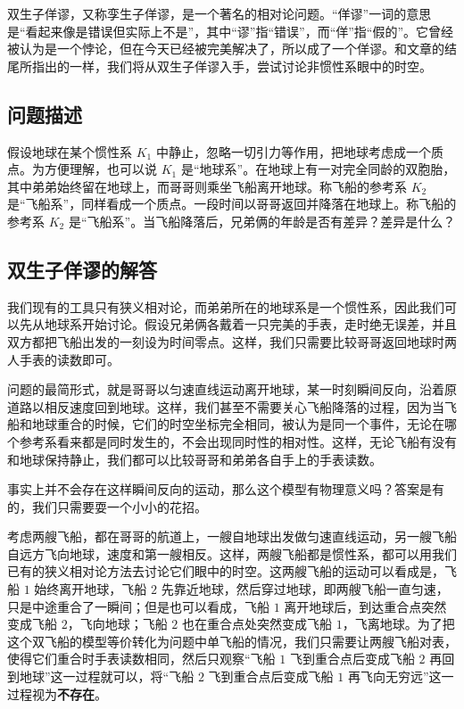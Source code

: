 

双生子佯谬，又称孪生子佯谬，是一个著名的相对论问题。“佯谬”一词的意思是“看起来像是错误但实际上不是”，其中“谬”指“错误”，而“佯”指“假的”。它曾经被认为是一个悖论，但在今天已经被完美解决了，所以成了一个佯谬。和文章的结尾所指出的一样，我们将从双生子佯谬入手，尝试讨论非惯性系眼中的时空。

\subsection{问题描述}

假设地球在某个惯性系 $K_1$ 中静止，忽略一切引力等作用，把地球考虑成一个质点。为方便理解，也可以说 $K_1$ 是“地球系”。在地球上有一对完全同龄的双胞胎，其中弟弟始终留在地球上，而哥哥则乘坐飞船离开地球。称飞船的参考系 $K_2$ 是“飞船系”，同样看成一个质点。一段时间以哥哥返回并降落在地球上。称飞船的参考系 $K_2$ 是“飞船系”。当飞船降落后，兄弟俩的年龄是否有差异？差异是什么？

\subsection{双生子佯谬的解答}

我们现有的工具只有狭义相对论，而弟弟所在的地球系是一个惯性系，因此我们可以先从地球系开始讨论。假设兄弟俩各戴着一只完美的手表，走时绝无误差，并且双方都把飞船出发的一刻设为时间零点。这样，我们只需要比较哥哥返回地球时两人手表的读数即可。

问题的最简形式，就是哥哥以匀速直线运动离开地球，某一时刻瞬间反向，沿着原道路以相反速度回到地球。这样，我们甚至不需要关心飞船降落的过程，因为当飞船和地球重合的时候，它们的时空坐标完全相同，被认为是同一个事件，无论在哪个参考系看来都是同时发生的，不会出现同时性的相对性。这样，无论飞船有没有和地球保持静止，我们都可以比较哥哥和弟弟各自手上的手表读数。

事实上并不会存在这样瞬间反向的运动，那么这个模型有物理意义吗？答案是有的，我们只需要耍一个小小的花招。

考虑两艘飞船，都在哥哥的航道上，一艘自地球出发做匀速直线运动，另一艘飞船自远方飞向地球，速度和第一艘相反。这样，两艘飞船都是惯性系，都可以用我们已有的狭义相对论方法去讨论它们眼中的时空。这两艘飞船的运动可以看成是，飞船 $1$ 始终离开地球，飞船 $2$ 先靠近地球，然后穿过地球，即两艘飞船一直匀速，只是中途重合了一瞬间；但是也可以看成，飞船 $1$ 离开地球后，到达重合点突然变成飞船 $2$，飞向地球；飞船 $2$ 也在重合点处突然变成飞船 $1$，飞离地球。为了把这个双飞船的模型等价转化为问题中单飞船的情况，我们只需要让两艘飞船对表，使得它们重合时手表读数相同，然后只观察“飞船 $1$ 飞到重合点后变成飞船 $2$ 再回到地球”这一过程就可以，将“飞船 $2$ 飞到重合点后变成飞船 $1$ 再飞向无穷远”这一过程视为\textbf{不存在}。

